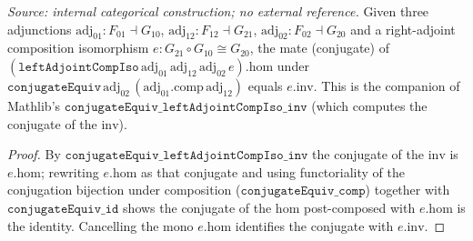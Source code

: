 \begin{lemma}\label{mk-lem:conjugate_equiv_leftadjointcompiso_hom}
  \leanok

  \textit{Source: internal categorical construction; no external reference.}
  Given three adjunctions \(\mathrm{adj}_{01} : F_{01} \dashv G_{10}\),
  \(\mathrm{adj}_{12} : F_{12} \dashv G_{21}\), \(\mathrm{adj}_{02} : F_{02} \dashv G_{20}\) and a
  right-adjoint composition isomorphism \(e : G_{21} \circ G_{10} \cong G_{20}\), the mate (conjugate)
  of \((\mathtt{leftAdjointCompIso}\,\mathrm{adj}_{01}\,\mathrm{adj}_{12}\,\mathrm{adj}_{02}\,e).\mathrm{hom}\)
  under \(\mathtt{conjugateEquiv}\,\mathrm{adj}_{02}\,(\mathrm{adj}_{01}.\mathrm{comp}\,\mathrm{adj}_{12})\)
  equals \(e.\mathrm{inv}\). This is the companion of Mathlib's
  \(\mathtt{conjugateEquiv\_leftAdjointCompIso\_inv}\) (which computes the conjugate of the \(\mathrm{inv}\)).
\end{lemma}
\begin{proof}
  \leanok


By \(\mathtt{conjugateEquiv\_leftAdjointCompIso\_inv}\) the conjugate of the \(\mathrm{inv}\) is
  \(e.\mathrm{hom}\); rewriting \(e.\mathrm{hom}\) as that conjugate and using functoriality of the
  conjugation bijection under composition (\(\mathtt{conjugateEquiv\_comp}\)) together with
  \(\mathtt{conjugateEquiv\_id}\) shows the conjugate of the \(\mathrm{hom}\) post-composed with
  \(e.\mathrm{hom}\) is the identity. Cancelling the mono \(e.\mathrm{hom}\) identifies the conjugate
  with \(e.\mathrm{inv}\).
\end{proof}

